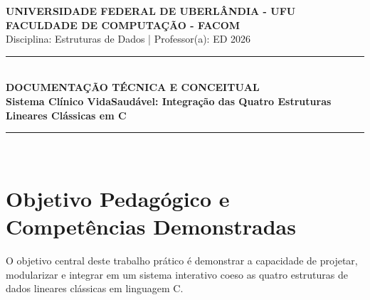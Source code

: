 \documentclass[11pt,a4paper]{article}
\begin{document}
\begin{center}
    {\large \textbf{UNIVERSIDADE FEDERAL DE UBERLÂNDIA - UFU}}\\[0.2cm]
    {\large \textbf{FACULDADE DE COMPUTAÇÃO - FACOM}}\\[0.2cm]
    {\normalsize Disciplina: Estruturas de Dados | Professor(a): ED 2026}\\[1.5cm]

    \rule{\linewidth}{1.5pt}\\[0.4cm]
    {\LARGE \textbf{DOCUMENTAÇÃO TÉCNICA E CONCEITUAL}}\\[0.3cm]
    {\Large \textbf{Sistema Clínico VidaSaudável: Integração das Quatro Estruturas Lineares Clássicas em C}}\\[0.4cm]
    \rule{\linewidth}{1.5pt}\\[1.5cm]
\end{center}

\begin{abstract}
Este documento apresenta uma análise conceitual, arquitetural e prática da implementação do sistema de atendimento hospitalar \textbf{Clínica VidaSaudável}, desenvolvido em linguagem C. O projeto atende integralmente aos requisitos curriculares de domínio das quatro estruturas de dados lineares clássicas: \textbf{Lista Simplesmente Encadeada com Cabeça} (cadastro de pacientes), \textbf{Lista Circular} (escala rotativa dos médicos), \textbf{Fila FIFO} (sala de espera) e \textbf{Pilha LIFO} (histórico de atendimentos reversível). São detalhados os conceitos de ponteiros simples e duplos, alocação dinâmica com gerenciamento rigoroso de memória, encapsulamento de Tipos Abstratos de Dados (TAD) e a mecânica interna de cada função implementada.
\end{abstract}

\vspace{0.8cm}
\tableofcontents
\newpage

\section{Objetivo Pedagógico e Competências Demonstradas}

O objetivo central deste trabalho prático é demonstrar a capacidade de projetar, modularizar e integrar em um sistema interativo coeso as quatro estruturas de dados lineares clássicas em linguagem C.
\end{document}
